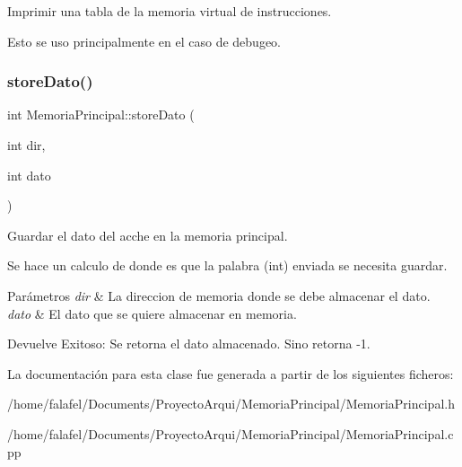 Imprimir una tabla de la memoria virtual de instrucciones. 

Esto se uso principalmente en el caso de debugeo. \mbox{\label{classMemoriaPrincipal_a0334ed61e40292259985655430efad33}} 
\subsubsection{\texorpdfstring{store\+Dato()}{storeDato()}}
{\footnotesize\ttfamily int Memoria\+Principal\+::store\+Dato (\begin{DoxyParamCaption}\item[{int}]{dir,  }\item[{int}]{dato }\end{DoxyParamCaption})}



Guardar el dato del acche en la memoria principal. 

Se hace un calculo de donde es que la palabra (int) enviada se necesita guardar. 
\begin{DoxyParams}{Parámetros}
{\em dir} & La direccion de memoria donde se debe almacenar el dato. \\
\hline
{\em dato} & El dato que se quiere almacenar en memoria. \\
\hline
\end{DoxyParams}
\begin{DoxyReturn}{Devuelve}
Exitoso\+: Se retorna el dato almacenado. Sino retorna -\/1. 
\end{DoxyReturn}


La documentación para esta clase fue generada a partir de los siguientes ficheros\+:\begin{DoxyCompactItemize}
\item 
/home/falafel/\+Documents/\+Proyecto\+Arqui/\+Memoria\+Principal/Memoria\+Principal.\+h\item 
/home/falafel/\+Documents/\+Proyecto\+Arqui/\+Memoria\+Principal/Memoria\+Principal.\+cpp\end{DoxyCompactItemize}
